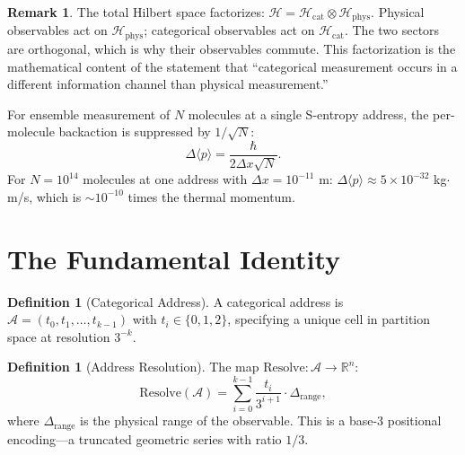 \documentclass[twocolumn,10pt]{article}
\theoremstyle{definition}
\newtheorem{definition}[theorem]{Definition}
\newtheorem{remark}[theorem]{Remark}
\newcommand{\R}{\mathbb{R}}
\newcommand{\Hcat}{\mathcal{H}_{\mathrm{cat}}}
\newcommand{\Hphys}{\mathcal{H}_{\mathrm{phys}}}
\begin{document}
\begin{remark}
The total Hilbert space factorizes: $\mathcal{H} = \Hcat \otimes \Hphys$. Physical observables act on $\Hphys$; categorical observables act on $\Hcat$. The two sectors are orthogonal, which is why their observables commute. This factorization is the mathematical content of the statement that ``categorical measurement occurs in a different information channel than physical measurement.''
\end{remark}

For ensemble measurement of $N$ molecules at a single S-entropy address, the per-molecule backaction is suppressed by $1/\sqrt{N}$:
\begin{equation}\label{eq:ensemble_backaction}
    \Delta\langle p\rangle = \frac{\hbar}{2\Delta x\sqrt{N}}.
\end{equation}
For $N = 10^{14}$ molecules at one address with $\Delta x = 10^{-11}$ m: $\Delta\langle p\rangle \approx 5 \times 10^{-32}$ kg$\cdot$m/s, which is $\sim 10^{-10}$ times the thermal momentum.

\section{The Fundamental Identity}\label{sec:fundamental_identity}

\begin{definition}[Categorical Address]\label{def:cat_address}
A categorical address is $\mathcal{A} = (t_0, t_1, \ldots, t_{k-1})$ with $t_i \in \{0, 1, 2\}$, specifying a unique cell in partition space at resolution $3^{-k}$.
\end{definition}

\begin{definition}[Address Resolution]\label{def:address_resolution}
The map $\mathrm{Resolve}: \mathcal{A} \to \R^n$:
\begin{equation}\label{eq:resolve}
    \mathrm{Resolve}(\mathcal{A}) = \sum_{i=0}^{k-1} \frac{t_i}{3^{i+1}} \cdot \Delta_{\mathrm{range}},
\end{equation}
where $\Delta_{\mathrm{range}}$ is the physical range of the observable. This is a base-3 positional encoding---a truncated geometric series with ratio $1/3$.
\end{definition}
\end{document}
